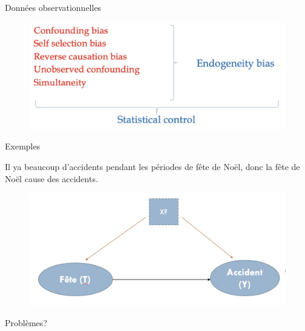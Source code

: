 \documentclass[ignorenonframetext,]{beamer}
\begin{document}
\begin{frame}{Données observationnelles}
\protect\hypertarget{donnees-observationnelles-3}{}

\begin{figure}
\includegraphics[width=1\linewidth]{endogeneite} \end{figure}

\end{frame}

\begin{frame}{Exemples}
\protect\hypertarget{exemples}{}

Il ya beaucoup d'accidents pendant les périodes de fête de Noël, donc la
fête de Noël cause des accidents.

\begin{figure}
\includegraphics[width=0.8\linewidth]{confounding} \end{figure}

Problèmes?

\end{frame}
\end{document}
